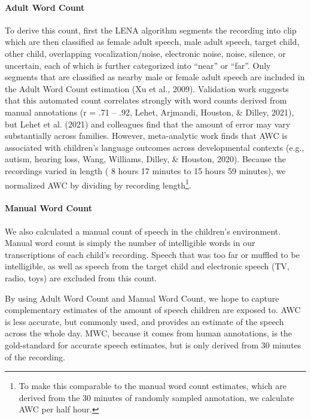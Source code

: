 \documentclass[
  man]{apa6}
\let\oldparagraph\paragraph
\renewcommand{\paragraph}[1]{\oldparagraph{#1}\mbox{}}
\begin{document}
\hypertarget{adult-word-count}{%
\paragraph{Adult Word Count}\label{adult-word-count}}

To derive this count, first the LENA algorithm segments the recording into clip which are then classified as female adult speech, male adult speech, target child, other child, overlapping vocalization/noise, electronic noise, noise, silence, or uncertain, each of which is further categorized into ``near'' or ``far''. Only segments that are classified as nearby male or female adult speech are included in the Adult Word Count estimation (Xu et al., 2009). Validation work suggests that this automated count correlates strongly with word counts derived from manual annotations (r = .71 -- .92, Lehet, Arjmandi, Houston, \& Dilley, 2021), but Lehet et al. (2021) and colleagues find that the amount of error may vary substantially across families. However, meta-analytic work finds that AWC is associated with children's language outcomes across developmental contexts (e.g., autism, hearing loss, Wang, Williams, Dilley, \& Houston, 2020). Because the recordings varied in length ( 8 hours 17 minutes to 15 hours 59 minutes), we normalized AWC by dividing by recording length\footnote{To make this comparable to the manual word count estimates, which are derived from the 30 minutes of randomly sampled annotation, we calculate AWC per half hour.}.

\hypertarget{manual-word-count}{%
\paragraph{Manual Word Count}\label{manual-word-count}}

We also calculated a manual count of speech in the children's environment. Manual word count is simply the number of intelligible words in our transcriptions of each child's recording. Speech that was too far or muffled to be intelligible, as well as speech from the target child and electronic speech (TV, radio, toys) are excluded from this count.

By using Adult Word Count and Manual Word Count, we hope to capture complementary estimates of the amount of speech children are exposed to. AWC is less accurate, but commonly used, and provides an estimate of the speech across the whole day. MWC, because it comes from human annotations, is the gold-standard for accurate speech estimates, but is only derived from 30 minutes of the recording.
\end{document}
